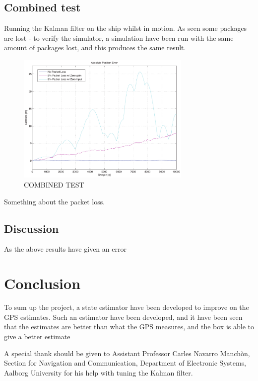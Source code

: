\documentclass{ifacconf}
\begin{document}
\subsection{Combined test}
Running the Kalman filter on the ship whilst in motion. As seen some packages are lost - to verify the simulator, a simulation have been run with the same amount of packages lost, and this produces the same result. 
\begin{figure}
	\begin{center}
		\includegraphics[width=8.4cm]{img/abspos}    %
		\caption{COMBINED TEST}  %
		\label{fig:3points}               
	\end{center}                                 %
\end{figure}

Something about the packet loss. 

\subsection{Discussion}

As the above results have given an error 


\section{Conclusion}
To sum up the project, a state estimator have been developed to improve on the GPS estimates. Such an estimator have been developed, and it have been seen that the estimates are better than what the GPS measures, and the box is able to give a better estimate 

\begin{ack}                               %
A special thank should be given to Assistant Professor Carles Navarro Manchòn, Section for Navigation and Communication, Department of Electronic Systems, Aalborg University for his help with tuning the Kalman filter.  %
\end{ack}
\end{document}
